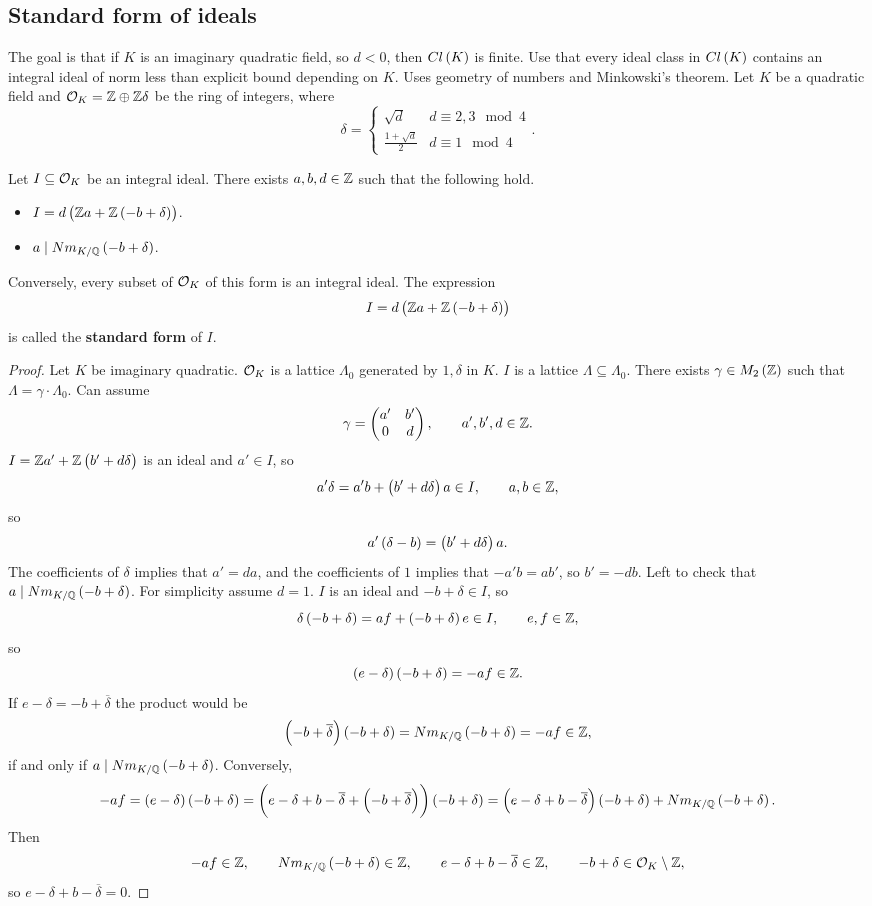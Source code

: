 \subsection{Standard form of ideals}

The goal is that if $ K $ is an imaginary quadratic field, so $ d < 0 $, then $ Cl\br{K} $ is finite. Use that every ideal class in $ Cl\br{K} $ contains an integral ideal of norm less than explicit bound depending on $ K $. Uses geometry of numbers and Minkowski's theorem. Let $ K $ be a quadratic field and $ \mathcal{O}_K = \mathbb{Z} \oplus \mathbb{Z}\delta $ be the ring of integers, where
$$ \delta =
\begin{cases}
\sqrt{d} & d \equiv 2, 3 \mod 4 \\
\tfrac{1 + \sqrt{d}}{2} & d \equiv 1 \mod 4
\end{cases}.
$$

\begin{proposition}
Let $ I \subseteq \mathcal{O}_K $ be an integral ideal. There exists $ a, b, d \in \mathbb{Z} $ such that the following hold.
\begin{itemize}
\item $ I = d\br{\Z a + \Z\br{-b + \delta}} $.
\item $ a \mid Nm_{K / \Q}\br{-b + \delta} $.
\end{itemize}
\end{proposition}

Conversely, every subset of $ \mathcal{O}_K $ of this form is an integral ideal. The expression
$$ I = d\br{\Z a + \Z\br{-b + \delta}} $$
is called the \textbf{standard form} of $ I $.

\begin{proof}
Let $ K $ be imaginary quadratic. $ \mathcal{O}_K $ is a lattice $ \Lambda_0 $ generated by $ 1, \delta $ in $ K $. $ I $ is a lattice $ \Lambda \subseteq \Lambda_0 $. There exists $ \gamma \in M_2\br{\Z} $ such that $ \Lambda = \gamma \cdot \Lambda_0 $. Can assume
$$ \gamma = \begin{pmatrix} a' & b' \\ 0 & d \end{pmatrix}, \qquad a', b', d \in \mathbb{Z}. $$
$ I = \Z a' + \Z\br{b' + d\delta} $ is an ideal and $ a' \in I $, so
$$ a'\delta = a'b + \br{b' + d\delta}a \in I, \qquad a, b \in \Z, $$
so
$$ a'\br{\delta - b} = \br{b' + d\delta}a. $$
The coefficients of $ \delta $ implies that $ a' = da $, and the coefficients of $ 1 $ implies that $ -a'b = ab' $, so $ b' = -db $. Left to check that $ a \mid Nm_{K / \Q}\br{-b + \delta} $. For simplicity assume $ d = 1 $. $ I $ is an ideal and $ -b + \delta \in I $, so
$$ \delta\br{-b + \delta} = af + \br{-b + \delta}e \in I, \qquad e, f \in \Z, $$
so
$$ \br{e - \delta}\br{-b + \delta} = -af \in \Z. $$
If $ e - \delta = -b + \overline{\delta} $ the product would be
$$ \br{-b + \overline{\delta}}\br{-b + \delta} = Nm_{K / \Q}\br{-b + \delta} = -af \in \Z, $$
if and only if $ a \mid Nm_{K / \Q}\br{-b + \delta} $. Conversely,
$$ -af = \br{e - \delta}\br{-b + \delta} = \br{e - \delta + b - \overline{\delta} + \br{-b + \overline{\delta}}}\br{-b + \delta} = \br{e - \delta + b - \overline{\delta}}\br{-b + \delta} + Nm_{K / \Q}\br{-b + \delta}. $$
Then
$$ -af \in \Z, \qquad Nm_{K / \Q}\br{-b + \delta} \in \Z, \qquad e - \delta + b - \overline{\delta} \in \Z, \qquad -b + \delta \in \OO_K \setminus \Z, $$
so $ e - \delta + b - \overline{\delta} = 0 $.
\end{proof}


